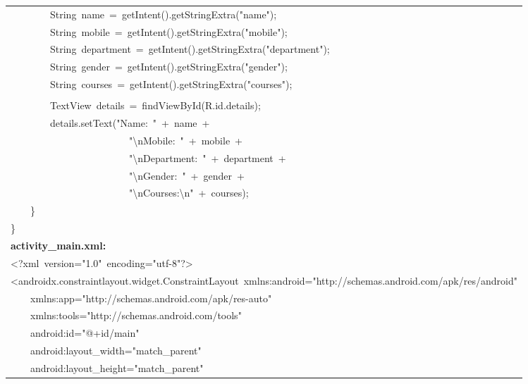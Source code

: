 \documentclass[a4paper,12pt]{article}
\begin{document}
\begin{longtable}{|p{}|}
{\ttfamily\small \ \ \ \ \ \ \ \ String\ name\ =\ getIntent().getStringExtra("name");} \\
{\ttfamily\small \ \ \ \ \ \ \ \ String\ mobile\ =\ getIntent().getStringExtra("mobile");} \\
{\ttfamily\small \ \ \ \ \ \ \ \ String\ department\ =\ getIntent().getStringExtra("department");} \\
{\ttfamily\small \ \ \ \ \ \ \ \ String\ gender\ =\ getIntent().getStringExtra("gender");} \\
{\ttfamily\small \ \ \ \ \ \ \ \ String\ courses\ =\ getIntent().getStringExtra("courses");} \\
\strut \\
{\ttfamily\small \ \ \ \ \ \ \ \ TextView\ details\ =\ findViewById(R.id.details);} \\
{\ttfamily\small \ \ \ \ \ \ \ \ details.setText("Name:\ "\ +\ name\ +\ } \\
{\ttfamily\small \ \ \ \ \ \ \ \ \ \ \ \ \ \ \ \ \ \ \ \ \ \ \ \ "\textbackslash{}nMobile:\ "\ +\ mobile\ +\ } \\
{\ttfamily\small \ \ \ \ \ \ \ \ \ \ \ \ \ \ \ \ \ \ \ \ \ \ \ \ "\textbackslash{}nDepartment:\ "\ +\ department\ +\ } \\
{\ttfamily\small \ \ \ \ \ \ \ \ \ \ \ \ \ \ \ \ \ \ \ \ \ \ \ \ "\textbackslash{}nGender:\ "\ +\ gender\ +\ } \\
{\ttfamily\small \ \ \ \ \ \ \ \ \ \ \ \ \ \ \ \ \ \ \ \ \ \ \ \ "\textbackslash{}nCourses:\textbackslash{}n"\ +\ courses);} \\
{\ttfamily\small \ \ \ \ \}} \\
{\ttfamily\small \}} \\
\hline
\rule{0pt}{13pt}\textbf{activity\_main.xml:} \\
\hline
{\ttfamily\small \textless{}?xml\ version="1.0"\ encoding="utf-8"?\textgreater{}} \\
{\ttfamily\small \textless{}androidx.constraintlayout.widget.ConstraintLayout\ xmlns:android="http://schemas.android.com/apk/res/android"} \\
{\ttfamily\small \ \ \ \ xmlns:app="http://schemas.android.com/apk/res-auto"} \\
{\ttfamily\small \ \ \ \ xmlns:tools="http://schemas.android.com/tools"} \\
{\ttfamily\small \ \ \ \ android:id="@+id/main"} \\
{\ttfamily\small \ \ \ \ android:layout\_width="match\_parent"} \\
{\ttfamily\small \ \ \ \ android:layout\_height="match\_parent"} \\

\end{longtable}
\end{document}
